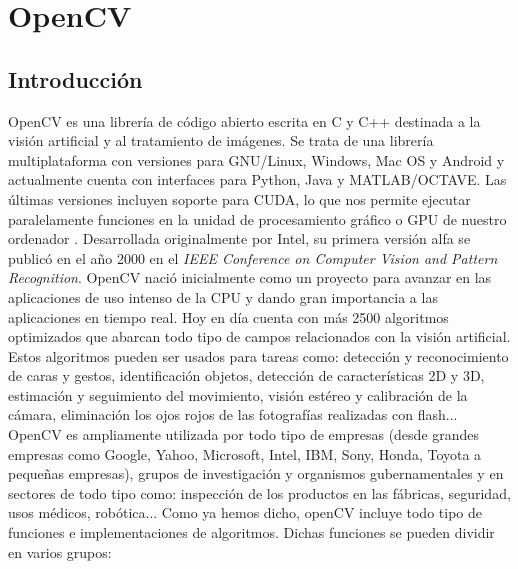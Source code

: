 \documentclass[a4paper,openright, 12pt]{book}
\begin{document}
\chapter{OpenCV}

\section{Introducción}
OpenCV es una librería de código abierto escrita en C y C++ destinada a la visión artificial y al tratamiento de imágenes. Se trata de una librería multiplataforma con versiones para GNU/Linux, Windows, Mac OS y Android y actualmente cuenta con interfaces para Python, Java y MATLAB/OCTAVE. Las últimas versiones incluyen soporte para CUDA, lo que nos permite ejecutar paralelamente funciones en la unidad de procesamiento gráfico o GPU de nuestro ordenador .
Desarrollada originalmente por Intel, su primera versión alfa se publicó en el año 2000 en el \textit{IEEE Conference on Computer Vision and Pattern Recognition}. OpenCV nació inicialmente como un proyecto para avanzar en las aplicaciones de uso intenso de la CPU y dando gran importancia a las aplicaciones en tiempo real. Hoy en día cuenta con más 2500 algoritmos optimizados que abarcan todo tipo de campos relacionados con la visión artificial.
Estos algoritmos pueden ser usados para tareas como: detección y reconocimiento de caras y gestos, identificación objetos, detección de características 2D y 3D, estimación y seguimiento del movimiento, visión estéreo y calibración de la cámara, eliminación los ojos rojos de las fotografías realizadas con flash...
\newline
OpenCV es ampliamente utilizada por todo tipo de empresas (desde grandes empresas como Google, Yahoo, Microsoft, Intel, IBM, Sony, Honda, Toyota a pequeñas empresas), grupos de investigación y organismos gubernamentales y en sectores de todo tipo como: inspección de los productos en las fábricas, seguridad, usos médicos, robótica...
\newline
Como ya hemos dicho, openCV incluye todo tipo de funciones e implementaciones de algoritmos. 
Dichas funciones se pueden dividir en varios grupos:
\end{document}
